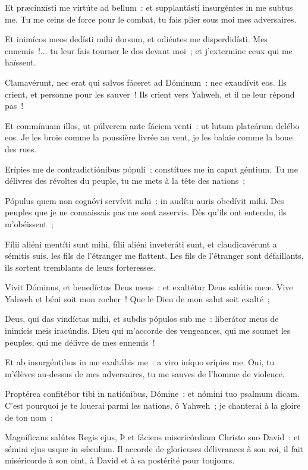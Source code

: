 \begin{paracol}{2}

\LigneParacol{0cm}
{Et præcinxísti me virtúte ad bellum~: \GreStar{} et supplantásti insurgéntes in me subtus me.}
{Tu me ceins de force pour le combat, tu fais plier sous moi mes adversaires. }

\LigneParacol{0.2cm}
{Et inimícos meos dedísti mihi dorsum, \GreStar{} et odiéntes me disperdidísti.}
{Mes ennemis~!... tu leur fais tourner le dos devant moi~; et j'extermine ceux qui me haïssent. }

\LigneParacol{0.2cm}
{Clamavérunt, nec erat qui salvos fáceret ad Dóminum~: \GreStar{} nec exaudívit eos.}
{Ils crient, et personne pour les sauver~! Ils crient vers Yahweh, et il ne leur répond pas~! }

\LigneParacol{0.2cm}
{Et commínuam illos, ut púlverem ante fáciem venti~: \GreStar{} ut lutum plateárum delébo eos.}
{Je les broie comme la poussière livrée au vent, je les balaie comme la boue des rues. }

\LigneParacol{0.2cm}
{Erípies me de contradictiónibus pópuli~: \GreStar{} constítues me in caput géntium.}
{Tu me délivres des révoltes du peuple, tu me mets à la tête des nations~;}

\LigneParacol{0.2cm}
{Pópulus quem non cognóvi servívit mihi~: \GreStar{} in audítu auris obedívit mihi.}
{Des peuples que je ne connaissais pas me sont asservis. Dès qu'ils ont entendu, ils m'obéissent~;}

\LigneParacol{0.2cm}
{Fílii aliéni mentíti sunt mihi, \GreStar{} fílii aliéni inveteráti sunt, et claudicavérunt a sémitis suis.}
{les fils de l'étranger me flattent. Les fils de l'étranger sont défaillants, ils sortent tremblants de leurs forteresses. }

\end{paracol}
\Gloria
\begin{paracol}{2}

\LigneParacol{0cm}
{Vivit Dóminus, et benedíctus Deus meus~: \GreStar{} et exaltétur Deus salútis meæ.}
{Vive Yahweh et béni soit mon rocher~! Que le Dieu de mon salut soit exalté~; }

\LigneParacol{0.2cm}
{Deus, qui das vindíctas mihi, et subdis pópulos sub me~: \GreStar{} liberátor meus de inimícis meis iracúndis.}
{Dieu qui m'accorde des vengeances, qui me soumet les peuples, qui me délivre de mes ennemis~!}

\LigneParacol{0.2cm}
{Et ab insurgéntibus in me exaltábis me~: \GreStar{} a viro iníquo erípies me.}
{Oui, tu m'élèves au-dessus de mes adversaires, tu me sauves de l'homme de violence. }

\LigneParacol{0.2cm}
{Proptérea confitébor tibi in natiónibus, Dómine~: \GreStar{} et nómini tuo psalmum dicam.}
{C'est pourquoi je te louerai parmi les nations, ô Yahweh~; je chanterai à la gloire de ton nom~:}

\LigneParacol{0.2cm}
{Magníficans salútes Regis ejus, Þ et fáciens misericórdiam Christo suo David~: \GreStar{} et sémini ejus usque in sǽculum.}
{Il accorde de glorieuses délivrances à son roi, il fait miséricorde à son oint, à David et à sa postérité pour toujours. }

\end{paracol}
